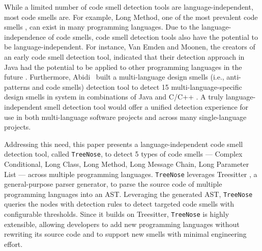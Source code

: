 
While a limited number of code smell detection tools are language-independent,
most code smells are. For example, Long Method, one of the most prevalent code
smells \cite{developersCare}, can exist in many programming languages. Due to
the language-independence of code smells, code smell detection tools also have
the potential to be language-independent. For instance, Van Emden and Moonen,
the creators of an early code smell detection tool, indicated that their
detection approach in Java had the potential to be applied to other programming
languages in the future \cite{1173068}. Furthermore, Abidi~\etal{} built a
multi-language design smells (i.e., anti-patterns and code smells) detection
tool to detect 15 multi-language-specific design smells in system in
combinations of Java and C/C++ \cite{MultiLanguageCodeSmells,Fault-Prone}. A
truly language-independent smell detection tool would offer a unified detection
experience for use in both multi-language software projects and across many
single-language projects.


Addressing this need, this paper presents a language-independent code smell
detection tool, called \texttt{TreeNose}, to detect 5 types of code smells ---
Complex Conditional, Long Class, Long Method, Long Message Chain, Long Parameter
List --- across multiple programming languages. \texttt{TreeNose} leverages
Treesitter \cite{treeSitter}, a general-purpose parser generator, to parse the
source code of multiple programming languages into an AST. Leveraging the
generated AST, \texttt{TreeNose} queries the nodes with detection rules to
detect targeted code smells with configurable thresholds. Since it builds on
Treesitter, \texttt{TreeNose} is highly extensible, allowing developers to add
new programming languages without rewriting its source code and to support new
smells with minimal engineering effort.


